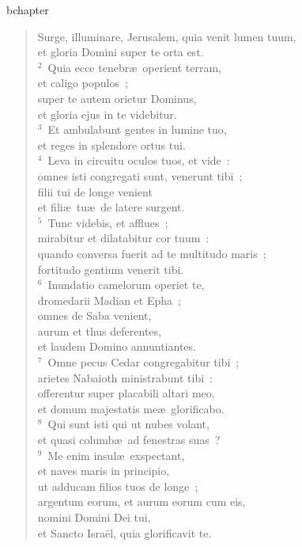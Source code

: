 bchapter\begin{verse}\vspace{-19pt}Surge, illuminare, Jerusalem, quia venit lumen tuum,\\ et gloria Domini super te orta est.\\
${}^{2}$~Quia ecce tenebr\ae\ operient terram,\\ et caligo populos~;\\ super te autem orietur Dominus,\\ et gloria ejus in te videbitur.\\
${}^{3}$~Et ambulabunt gentes in lumine tuo,\\ et reges in splendore ortus tui.\\
${}^{4}$~Leva in circuitu oculos tuos, et vide~:\\ omnes isti congregati sunt, venerunt tibi~;\\ filii tui de longe venient\\ et fili\ae\ tu\ae\ de latere surgent.\\
${}^{5}$~Tunc videbis, et afflues~;\\ mirabitur et dilatabitur cor tuum~:\\ quando conversa fuerit ad te multitudo maris~;\\ fortitudo gentium venerit tibi.\\
${}^{6}$~Inundatio camelorum operiet te,\\ dromedarii Madian et Epha~;\\ omnes de Saba venient,\\ aurum et thus deferentes,\\ et laudem Domino annuntiantes.\\
${}^{7}$~Omne pecus Cedar congregabitur tibi~;\\ arietes Nabaioth ministrabunt tibi~:\\ offerentur super placabili altari meo,\\ et domum majestatis me\ae\ glorificabo.\\
${}^{8}$~Qui sunt isti qui ut nubes volant,\\ et quasi columb\ae\ ad fenestras suas~?\\
${}^{9}$~Me enim insul\ae\ exspectant,\\ et naves maris in principio,\\ ut adducam filios tuos de longe~;\\ argentum eorum, et aurum eorum cum eis,\\ nomini Domini Dei tui,\\ et Sancto Isra\"el, quia glorificavit te.\\

\end{verse}

